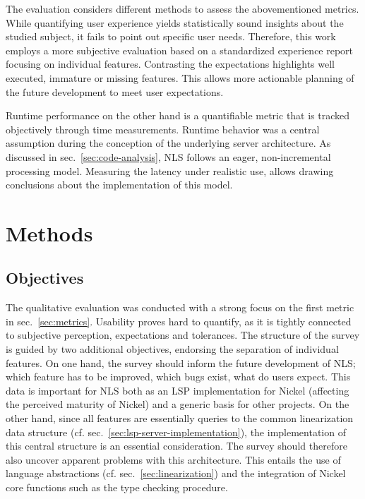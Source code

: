 \documentclass[
  a4paper,
  bibtex,
  english,
  nomenclature]{kthlatex/kththesis/kththesis}
\begin{document}
The evaluation considers different methods to assess the abovementioned
metrics. While quantifying user experience yields statistically sound
insights about the studied subject, it fails to point out specific user
needs. Therefore, this work employs a more subjective evaluation based
on a standardized experience report focusing on individual features.
Contrasting the expectations highlights well executed, immature or
missing features. This allows more actionable planning of the future
development to meet user expectations.

Runtime performance on the other hand is a quantifiable metric that is
tracked objectively through time measurements. Runtime behavior was a
central assumption during the conception of the underlying server
architecture. As discussed in sec.~\ref{sec:code-analysis}, NLS follows
an eager, non-incremental processing model. Measuring the latency under
realistic use, allows drawing conclusions about the implementation of
this model.

\hypertarget{sec:methods}{%
\section{Methods}\label{sec:methods}}

\hypertarget{sec:objectives}{%
\subsection{Objectives}\label{sec:objectives}}

The qualitative evaluation was conducted with a strong focus on the
first metric in sec.~\ref{sec:metrics}. Usability proves hard to
quantify, as it is tightly connected to subjective perception,
expectations and tolerances. The structure of the survey is guided by
two additional objectives, endorsing the separation of individual
features. On one hand, the survey should inform the future development
of NLS; which feature has to be improved, which bugs exist, what do
users expect. This data is important for NLS both as an LSP
implementation for Nickel (affecting the perceived maturity of Nickel)
and a generic basis for other projects. On the other hand, since all
features are essentially queries to the common linearization data
structure (cf. sec.~\ref{sec:lsp-server-implementation}), the
implementation of this central structure is an essential consideration.
The survey should therefore also uncover apparent problems with this
architecture. This entails the use of language abstractions (cf.
sec.~\ref{sec:linearization}) and the integration of Nickel core
functions such as the type checking procedure.
\end{document}
